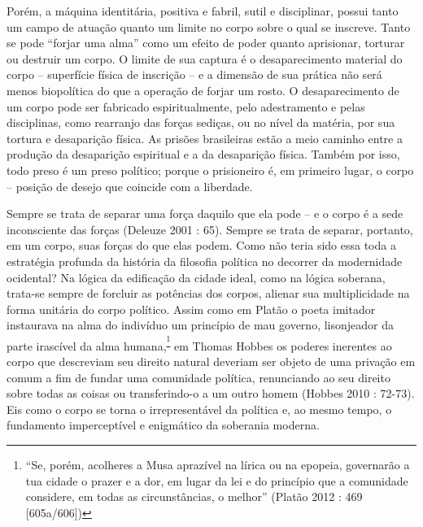 Porém, a máquina identitária, positiva e fabril, sutil e disciplinar,
possui tanto um campo de atuação quanto um limite no corpo sobre o qual
se inscreve. Tanto se pode ``forjar uma alma'' como um efeito de poder
quanto aprisionar, torturar ou destruir um corpo. O limite de sua
captura é o desaparecimento material do corpo -- superfície física de
inscrição -- e a dimensão de sua prática não será menos biopolítica do
que a operação de forjar um rosto. O desaparecimento de um corpo pode
ser fabricado espiritualmente, pelo adestramento e pelas disciplinas,
como rearranjo das forças sediças, ou no nível da matéria, por sua
tortura e desaparição física. As prisões brasileiras estão a meio
caminho entre a produção da desaparição espiritual e a da desaparição
física. Também por isso, todo preso é um preso político; porque o
prisioneiro é, em primeiro lugar, o corpo -- posição de desejo que
coincide com a liberdade.

Sempre se trata de separar uma força daquilo que ela pode -- e o corpo é
a sede inconsciente das forças (Deleuze 2001 : 65). Sempre se trata de
separar, portanto, em um corpo, suas forças do que elas podem. Como não
teria sido essa toda a estratégia profunda da história da filosofia
política no decorrer da modernidade ocidental? Na lógica da edificação
da cidade ideal, como na lógica soberana, trata-se sempre de forcluir as
potências dos corpos, alienar sua multiplicidade na forma unitária do
corpo político. Assim como em Platão o poeta imitador instaurava na alma
do indivíduo um princípio de mau governo, lisonjeador da parte irascível
da alma humana,\textsuperscript{\footnote{``Se, porém, acolheres a Musa
  aprazível na lírica ou na epopeia, governarão a tua cidade o prazer e
  a dor, em lugar da lei e do princípio que a comunidade considere, em
  todas as circunstâncias, o melhor'' (Platão 2012 : 469 {[}605a/606{]})}}
em Thomas Hobbes os poderes inerentes ao corpo que descreviam seu
direito natural deveriam ser objeto de uma privação em comum a fim de
fundar uma comunidade política, renunciando ao seu direito sobre todas
as coisas ou transferindo-o a um outro homem (Hobbes 2010 : 72-73). Eis
como o corpo se torna o irrepresentável da política e, ao mesmo tempo, o
fundamento imperceptível e enigmático da soberania moderna.

